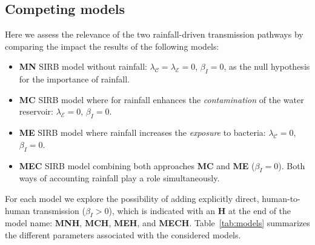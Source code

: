\subsection{Competing models}
Here we assess the relevance of the two rainfall-driven transmission pathways by comparing the impact the results of the following models:
\begin{itemize}
 \item \textbf{MN} SIRB model without rainfall: $\lambda_{\mathcal{C}} = \lambda_{\mathcal{E}} = 0$, $\beta_{I} = 0$, as the null hypothesis for the importance of rainfall.
  \item \textbf{MC} SIRB model where for rainfall enhances the \textit{contamination} of the water reservoir: $\lambda_{\mathcal{E}} = 0$, $\beta_{I} = 0$. 
  \item \textbf{ME} SIRB model where rainfall increases the \textit{exposure} to bacteria: $\lambda_{\mathcal{C}} = 0$, $\beta_{I} = 0$. 
  \item \textbf{MEC} SIRB model combining both approaches \textbf{MC} and \textbf{ME} ($\beta_{I} = 0$). Both ways of accounting rainfall play a role simultaneously.
\end{itemize}

 For each model we explore the possibility of adding explicitly direct, human-to-human transmission ($\beta_{I} > 0$), which is indicated with an \textbf{H} at the end of the model name: \textbf{MNH}, \textbf{MCH}, \textbf{MEH}, and \textbf{MECH}. Table~\ref{tab:models} summarizes the different parameters associated with the considered models.

